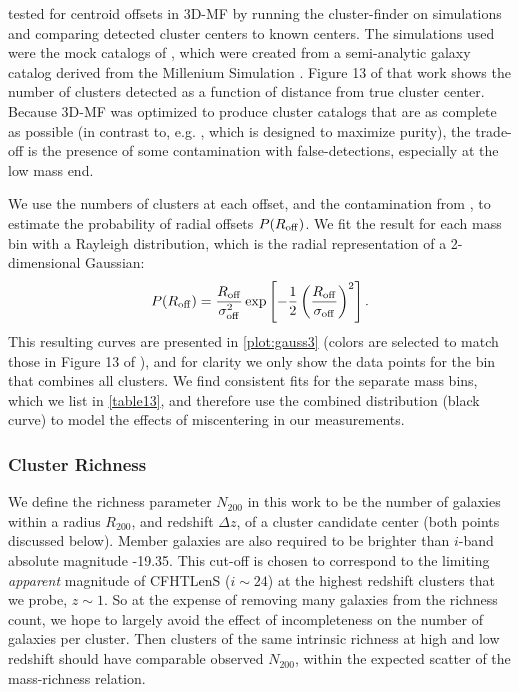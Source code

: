 \citet{Milkeraitis10} tested for centroid offsets in \ac{3D-MF} by running the cluster-finder on simulations and comparing detected cluster centers to known centers. The simulations used were the mock catalogs of \citet{KW07}, which were created from a semi-analytic galaxy catalog \citep{DeLucia07} derived from the Millenium Simulation \citep{Springel05}. Figure 13 of that work shows the number of clusters detected as a function of distance from true cluster center. Because \ac{3D-MF} was optimized to produce cluster catalogs that are as complete as possible (in contrast to, e.g. \citet{Gillis11}, which is designed to maximize purity), the trade-off is the presence of some contamination with false-detections, especially at the low mass end.

We use the numbers of clusters at each offset, and the contamination from \citet{Milkeraitis10}, to estimate the probability of radial offsets $P(R_{\rm{off}})$. We fit the result for each mass bin with a Rayleigh distribution, which is the radial representation of a 2-dimensional Gaussian:
\begin{equation}
P(R_{\rm{off}}) = \frac{R_{\rm{off}}}{\sigma_{\rm{off}}^2} \exp \left[ -\frac{1}{2}\left( \frac{R_{\rm{off}}}{\sigma_{\rm{off}}} \right)^2 \right].
\label{eqn:PofRc3}
\end{equation}
This resulting curves are presented in \autoref{plot:gauss3} (colors are selected to match those in Figure 13 of \citet{Milkeraitis10}), and for clarity we only show the data points for the bin that combines all clusters. We find consistent fits for the separate mass bins, which we list in \autoref{table13}, and therefore use the combined distribution (black curve) to model the effects of miscentering in our measurements.


\subsubsection{Cluster Richness}
\label{sec:rich3}
We define the richness parameter $N_{200}$ in this work to be the number of galaxies within a radius $R_{200}$, and redshift $\Delta z$, of a cluster candidate center (both points discussed below). Member galaxies are also required to be brighter than $i$-band absolute magnitude -19.35. This cut-off is chosen to correspond to the limiting {\it apparent} magnitude of \ac{CFHTLenS} ($i \sim 24$) at the highest redshift clusters that we probe, $z \sim 1$. So at the expense of removing many galaxies from the richness count, we hope to largely avoid the effect of incompleteness on the number of galaxies per cluster. Then clusters of the same intrinsic richness at high and low redshift should have comparable observed $N_{200}$, within the expected scatter of the mass-richness relation.

